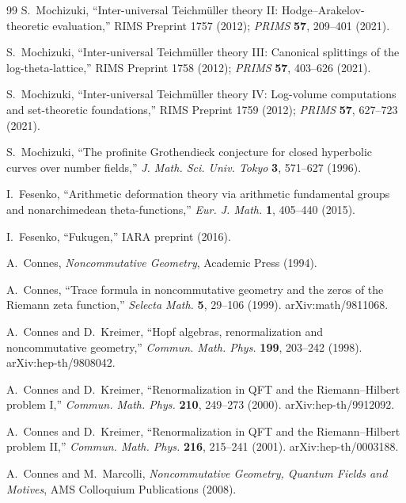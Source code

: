 \documentclass[12pt,a4paper]{article}
\theoremstyle{definition}
\begin{document}
\begin{thebibliography}{99}
S.~Mochizuki, ``Inter-universal Teichm\"{u}ller theory II: Hodge--Arakelov-theoretic evaluation,'' RIMS Preprint 1757 (2012); \textit{PRIMS} \textbf{57}, 209--401 (2021).

S.~Mochizuki, ``Inter-universal Teichm\"{u}ller theory III: Canonical splittings of the log-theta-lattice,'' RIMS Preprint 1758 (2012); \textit{PRIMS} \textbf{57}, 403--626 (2021).

S.~Mochizuki, ``Inter-universal Teichm\"{u}ller theory IV: Log-volume computations and set-theoretic foundations,'' RIMS Preprint 1759 (2012); \textit{PRIMS} \textbf{57}, 627--723 (2021).

S.~Mochizuki, ``The profinite Grothendieck conjecture for closed hyperbolic curves over number fields,'' \textit{J. Math. Sci. Univ. Tokyo} \textbf{3}, 571--627 (1996).

I.~Fesenko, ``Arithmetic deformation theory via arithmetic fundamental groups and nonarchimedean theta-functions,'' \textit{Eur. J. Math.} \textbf{1}, 405--440 (2015).

I.~Fesenko, ``Fukugen,'' IARA preprint (2016).

A.~Connes, \textit{Noncommutative Geometry}, Academic Press (1994).

A.~Connes, ``Trace formula in noncommutative geometry and the zeros of the Riemann zeta function,'' \textit{Selecta Math.} \textbf{5}, 29--106 (1999). arXiv:math/9811068.

A.~Connes and D.~Kreimer, ``Hopf algebras, renormalization and noncommutative geometry,'' \textit{Commun. Math. Phys.} \textbf{199}, 203--242 (1998). arXiv:hep-th/9808042.

A.~Connes and D.~Kreimer, ``Renormalization in QFT and the Riemann--Hilbert problem I,'' \textit{Commun. Math. Phys.} \textbf{210}, 249--273 (2000). arXiv:hep-th/9912092.

A.~Connes and D.~Kreimer, ``Renormalization in QFT and the Riemann--Hilbert problem II,'' \textit{Commun. Math. Phys.} \textbf{216}, 215--241 (2001). arXiv:hep-th/0003188.

A.~Connes and M.~Marcolli, \textit{Noncommutative Geometry, Quantum Fields and Motives}, AMS Colloquium Publications (2008).


\end{thebibliography}
\end{document}
